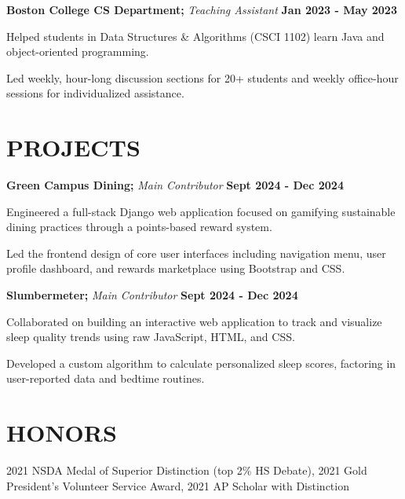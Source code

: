 \documentclass[11pt]{article}
\begin{document}
\raggedright
\textbf{Boston College CS Department;} \textit{Teaching Assistant} \hfill \textbf{Jan 2023 - May 2023}
\begin{sublist}
	\item Helped students in Data Structures \& Algorithms (CSCI 1102) learn Java and object-oriented programming. 
	\item Led weekly, hour-long discussion sections for 20+ students and weekly office-hour sessions for individualized assistance. 
\end{sublist}

\section*{PROJECTS}
\raggedright
\textbf{Green Campus Dining;}  \textit{Main Contributor} \hfill \textbf{Sept 2024 - Dec 2024}
\begin{sublist}
	\item Engineered a full-stack Django web application focused on gamifying sustainable dining practices through a points-based reward system.
	\item Led the frontend design of core user interfaces including navigation menu, user profile dashboard, and rewards marketplace using Bootstrap and CSS.
\end{sublist}

\raggedright
\textbf{Slumbermeter;}  \textit{Main Contributor} \hfill \textbf{Sept 2024 - Dec 2024}
\begin{sublist}
	\item Collaborated on building an interactive web application to track and visualize sleep quality trends using raw JavaScript, HTML, and CSS.
	\item Developed a custom algorithm to calculate personalized sleep scores, factoring in user-reported data and bedtime routines.
\end{sublist}

\section*{HONORS}
2021 NSDA Medal of Superior Distinction (top 2\% HS Debate), 2021 Gold President’s Volunteer Service Award, 2021 AP Scholar with Distinction
\end{document}
